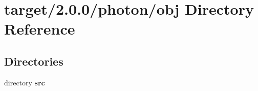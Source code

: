 \section{target/2.0.0/photon/obj Directory Reference}
\label{dir_f4e02eae036c027adfaeec909ab4c2aa}
\subsection*{Directories}
\begin{DoxyCompactItemize}
\item 
directory \textbf{ src}
\end{DoxyCompactItemize}
